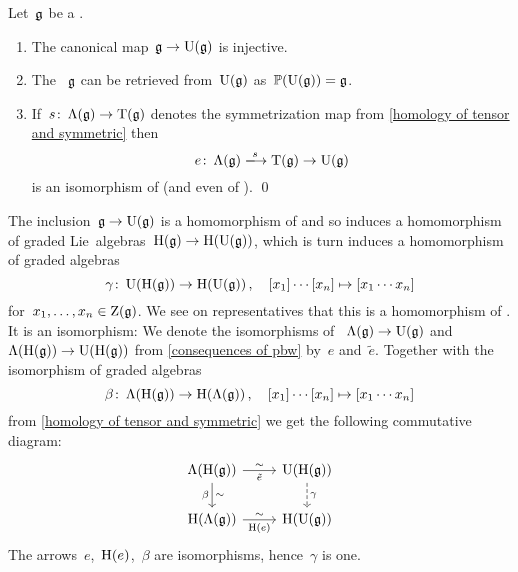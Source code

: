 \documentclass[a4paper,10pt,headings=standardclasses]{scrartcl}
\begin{document}
\begin{corollary}
  \label{consequences of pbw}
  Let~$\mathfrak{g}$ be a {\dgl}.
  \begin{enumerate}
    \item
      The canonical map~$\mathfrak{g} \to \operatorname{U}(\mathfrak{g})$ is injective.
    \item
      The {\dgl}~$\mathfrak{g}$ can be retrieved from~$\operatorname{U}(\mathfrak{g})$ as~$\mathbb{P}(\operatorname{U}(\mathfrak{g})) = \mathfrak{g}$.
    \item
      If~$s \colon \operatorname{\Lambda}(\mathfrak{g}) \to \operatorname{T}(\mathfrak{g})$ denotes the symmetrization map from \cref{homology of tensor and symmetric} then
      \[
        e
        \colon
        \dgSymm(\glie)
        \xlongto{s}
        \dgTensor(\glie)
        \to
        \Univ(\glie)
      \]
      is an isomorphism of {\dgvs} (and even of {\dgc}).
    \qed
  \end{enumerate}
\end{corollary}

\begin{example}
  The inclusion~$\mathfrak{g} \to \operatorname{U}(\mathfrak{g})$ is a homomorphism of {\dgl} and so induces a homomorphism of graded Lie~algebras~$\operatorname{H}(\mathfrak{g}) \to \operatorname{H}(\operatorname{U}(\mathfrak{g}))$, which is turn induces a homomorphism of graded algebras
  \[
    \gamma
    \colon
    \operatorname{U}(\operatorname{H}(\mathfrak{g}))
    \to
    \operatorname{H}(\operatorname{U}(\mathfrak{g})) \,,
    \quad
    [x_1] \dotsm [x_n]
    \mapsto
    [x_1 \dotsm x_n]
  \]
  for~$x_1, \dotsc, x_n \in \operatorname{Z}(\mathfrak{g})$.
  We see on representatives that this is a homomorphism of {\dghs}.
  It is an isomorphism:  
  We denote the isomorphisms of {\dgvs}~$\operatorname{\Lambda}(\mathfrak{g}) \to \operatorname{U}(\mathfrak{g})$ and~$\operatorname{\Lambda}(\operatorname{H}(\mathfrak{g})) \to \operatorname{U}(\operatorname{H}(\mathfrak{g}))$ from \cref{consequences of pbw} by~$e$ and~$\tilde{e}$.
  Together with the isomorphism of graded algebras
  \[
    \beta
    \colon
    \operatorname{\Lambda}(\operatorname{H}(\mathfrak{g}))
    \to
    \operatorname{H}(\operatorname{\Lambda}(\mathfrak{g})) \,,
    \quad
    [x_1] \dotsm [x_n]
    \mapsto
    [x_1 \dotsm x_n]
  \]
  from \cref{homology of tensor and symmetric} we get the following commutative diagram:
  \[
    \begin{tikzcd}
      \dgSymm(\homology(\glie))
      \arrow{r}[below]{\tilde{e}}[above]{\sim}
      \arrow{d}[left]{\beta}[right]{\sim}
      &
      \Univ(\homology(\glie))
      \arrow[dashed]{d}[right]{\gamma}
      \\
      \homology(\dgSymm(\glie))
      \arrow{r}[below]{\homology(e)}[above]{\sim}
      &
      \homology(\Univ(\glie))
    \end{tikzcd}
  \]
  The arrows~$e$,~$\operatorname{H}(e)$,~$\beta$ are isomorphisms, hence~$\gamma$ is one.
\end{example}
\end{document}
